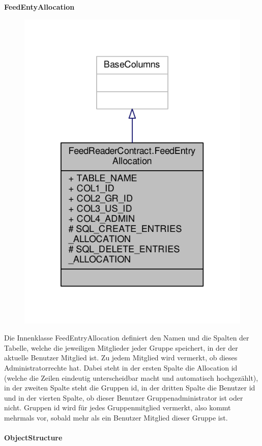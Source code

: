 \textbf{FeedEntyAllocation}
\begin{figure}[H]
	\includegraphics[scale = 1]{res/umlClasses/feed_reader_contract_allocation.pdf}
	\centering
\end{figure}
Die Innenklasse FeedEntryAllocation definiert den Namen und die Spalten der Tabelle, welche die jeweiligen Mitglieder jeder Gruppe speichert, in der der aktuelle Benutzer Mitglied ist. Zu jedem Mitglied wird vermerkt, ob dieses Administratorrechte hat.
Dabei steht in der ersten Spalte die Allocation id (welche die Zeilen eindeutig unterscheidbar macht und automatisch hochgezählt), in der zweiten Spalte steht die Gruppen id, in der dritten Spalte die Benutzer id und in der vierten Spalte, ob dieser Benutzer Gruppenadministrator ist oder nicht. 
Gruppen id wird für jedes Gruppenmitglied vermerkt, also kommt mehrmals vor, sobald mehr als ein Benutzer Mitglied dieser Gruppe ist. 

\paragraph{ObjectStructure}

